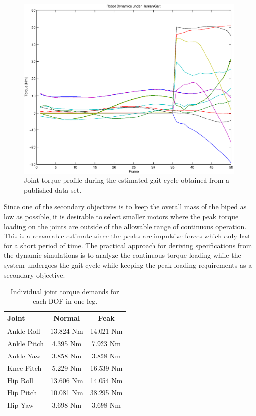 \begin{figure}[!h]
	\label{fig:gaitplot}
	\begin{center}
    \includegraphics[scale=0.6]{fig/design/gaitplot.eps}
	\end{center}
  \caption{Joint torque profile during the estimated gait cycle obtained from a published data set.}
\end{figure}

Since one of the secondary objectives is to keep the overall mass of the biped as low as possible, it is desirable to select smaller motors where the peak torque loading on the joints are outside of the allowable range of continuous operation. This is a reasonable estimate since the peaks are impulsive forces which only last for a short period of time. The practical approach for deriving specifications from the dynamic simulations is to analyze the continuous torque loading while the system undergoes the gait cycle while keeping the peak loading requirements as a secondary objective. 

\begin{table}[!h]
  \centering
  \caption{Individual joint torque demands for each DOF in one leg.}
    \begin{tabular}{lcc}
    \addlinespace
    \toprule
    \textbf{Joint} & \textbf{Normal} & \textbf{Peak}\\
    \midrule
    Ankle Roll	&	13.824 Nm	&	14.021 Nm\\
    Ankle Pitch	&	4.395 Nm	&	7.923 Nm\\
	Ankle Yaw	&	3.858 Nm	&	3.858 Nm\\
	Knee Pitch  &	5.229 Nm	&	16.539 Nm\\
	Hip Roll	&	13.606 Nm	&	14.054 Nm\\
	Hip Pitch	&	10.081 Nm	&	38.295 Nm\\
	Hip Yaw		&	3.698 Nm	&	3.698 Nm\\
    \bottomrule
    \end{tabular}%
  \label{jointtable}%
\end{table}%

